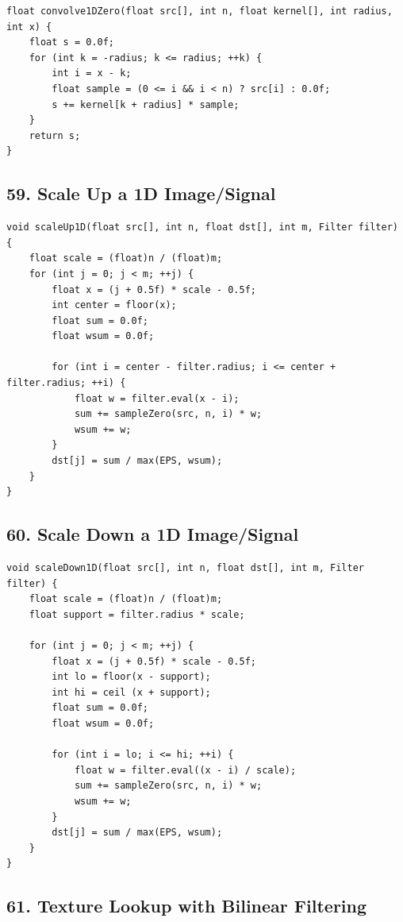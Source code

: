 \documentclass[10pt,letterpaper]{article}
\begin{document}
\begin{verbatim}
float convolve1DZero(float src[], int n, float kernel[], int radius, int x) {
    float s = 0.0f;
    for (int k = -radius; k <= radius; ++k) {
        int i = x - k;
        float sample = (0 <= i && i < n) ? src[i] : 0.0f;
        s += kernel[k + radius] * sample;
    }
    return s;
}
\end{verbatim}

\subsection{59. Scale Up a 1D Image/Signal}

\begin{verbatim}
void scaleUp1D(float src[], int n, float dst[], int m, Filter filter) {
    float scale = (float)n / (float)m;
    for (int j = 0; j < m; ++j) {
        float x = (j + 0.5f) * scale - 0.5f;
        int center = floor(x);
        float sum = 0.0f;
        float wsum = 0.0f;

        for (int i = center - filter.radius; i <= center + filter.radius; ++i) {
            float w = filter.eval(x - i);
            sum += sampleZero(src, n, i) * w;
            wsum += w;
        }
        dst[j] = sum / max(EPS, wsum);
    }
}
\end{verbatim}

\subsection{60. Scale Down a 1D Image/Signal}

\begin{verbatim}
void scaleDown1D(float src[], int n, float dst[], int m, Filter filter) {
    float scale = (float)n / (float)m;
    float support = filter.radius * scale;

    for (int j = 0; j < m; ++j) {
        float x = (j + 0.5f) * scale - 0.5f;
        int lo = floor(x - support);
        int hi = ceil (x + support);
        float sum = 0.0f;
        float wsum = 0.0f;

        for (int i = lo; i <= hi; ++i) {
            float w = filter.eval((x - i) / scale);
            sum += sampleZero(src, n, i) * w;
            wsum += w;
        }
        dst[j] = sum / max(EPS, wsum);
    }
}
\end{verbatim}

\subsection{61. Texture Lookup with Bilinear Filtering}
\end{document}
